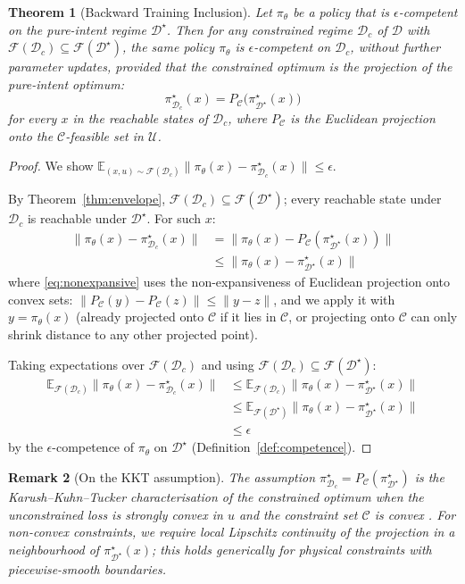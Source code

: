 \documentclass[twocolumn,11pt,a4paper]{article}
\newtheorem{theorem}{Theorem}[section]
\newtheorem{remark}[theorem]{Remark}
\newcommand{\cD}{\mathcal{D}}
\newcommand{\cF}{\mathcal{F}}
\newcommand{\cC}{\mathcal{C}}
\newcommand{\cU}{\mathcal{U}}
\newcommand{\E}{\mathbb{E}}
\begin{document}
\begin{theorem}[Backward Training Inclusion]
\label{thm:backward-inclusion}
Let $\pi_\theta$ be a policy that is $\epsilon$-competent on the pure-intent regime $\cD^\star$. Then for any constrained regime $\cD_c$ of $\cD$ with $\cF(\cD_c) \subseteq \cF(\cD^\star)$, the same policy $\pi_\theta$ is $\epsilon$-competent on $\cD_c$, without further parameter updates, provided that the constrained optimum is the projection of the pure-intent optimum:
\begin{equation}
\pi^\star_{\cD_c}(x) = P_{\cC}\bigl(\pi^\star_{\cD^\star}(x)\bigr)
\end{equation}
for every $x$ in the reachable states of $\cD_c$, where $P_\cC$ is the Euclidean projection onto the $\cC$-feasible set in $\cU$.
\end{theorem}

\begin{proof}
We show $\E_{(x, u) \sim \cF(\cD_c)} \|\pi_\theta(x) - \pi^\star_{\cD_c}(x)\| \leq \epsilon$.

By Theorem~\ref{thm:envelope}, $\cF(\cD_c) \subseteq \cF(\cD^\star)$; every reachable state under $\cD_c$ is reachable under $\cD^\star$. For such $x$:
\begin{align}
\|\pi_\theta(x) - \pi^\star_{\cD_c}(x)\|
&= \|\pi_\theta(x) - P_\cC(\pi^\star_{\cD^\star}(x))\| \\
&\leq \|\pi_\theta(x) - \pi^\star_{\cD^\star}(x)\| \label{eq:nonexpansive}
\end{align}
where \eqref{eq:nonexpansive} uses the non-expansiveness of Euclidean projection onto convex sets: $\|P_\cC(y) - P_\cC(z)\| \leq \|y - z\|$, and we apply it with $y = \pi_\theta(x)$ (already projected onto $\cC$ if it lies in $\cC$, or projecting onto $\cC$ can only shrink distance to any other projected point).

Taking expectations over $\cF(\cD_c)$ and using $\cF(\cD_c) \subseteq \cF(\cD^\star)$:
\begin{align}
\E_{\cF(\cD_c)} \|\pi_\theta(x) - \pi^\star_{\cD_c}(x)\|
&\leq \E_{\cF(\cD_c)} \|\pi_\theta(x) - \pi^\star_{\cD^\star}(x)\| \\
&\leq \E_{\cF(\cD^\star)} \|\pi_\theta(x) - \pi^\star_{\cD^\star}(x)\| \\
&\leq \epsilon
\end{align}
by the $\epsilon$-competence of $\pi_\theta$ on $\cD^\star$ (Definition~\ref{def:competence}).
\end{proof}

\begin{remark}[On the KKT assumption]
\label{rem:kkt}
The assumption $\pi^\star_{\cD_c} = P_\cC(\pi^\star_{\cD^\star})$ is the Karush--Kuhn--Tucker characterisation of the constrained optimum when the unconstrained loss is strongly convex in $u$ and the constraint set $\cC$ is convex \citep{boyd2004convex,nocedal2006numerical}. For non-convex constraints, we require local Lipschitz continuity of the projection in a neighbourhood of $\pi^\star_{\cD^\star}(x)$; this holds generically for physical constraints with piecewise-smooth boundaries.
\end{remark}
\end{document}

